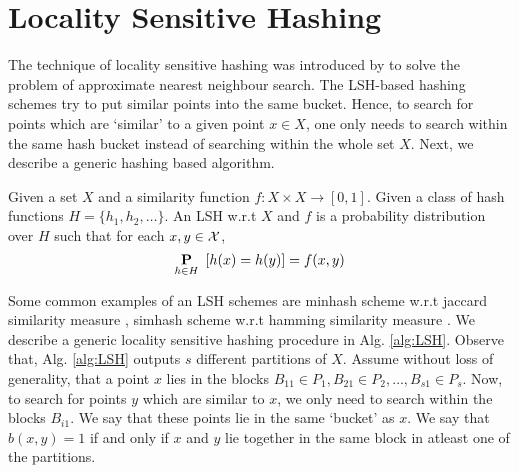 \section{Locality Sensitive Hashing}
\label{section:A-LSH}
The technique of locality sensitive hashing was introduced by \cite{gionis1999similarity} to solve the problem of approximate nearest neighbour search. The LSH-based hashing schemes try to put similar points into the same bucket. Hence, to search for points which are `similar' to a given point $x \in X$, one only needs to search within the same hash bucket instead of searching within the whole set $X$. Next, we describe a generic hashing based algorithm. 

\begin{definition}
\label{defn:LSH}
Given a set $X$ and a similarity function $f:X \times X \rightarrow [0, 1]$. Given a class of hash functions $H = \{h_1, h_2, \ldots \}$. An LSH w.r.t $X$ and $f$ is a probability distribution over $H$ such that for each $x, y \in \mathcal X$, $$\underset{h \in H}{\mathbf P}\enspace [h(x) = h(y)] = f(x, y)$$
\end{definition}
\noindent Some common examples of an LSH schemes are minhash scheme w.r.t jaccard similarity measure \cite{broder2000min, broder1997resemblance}, simhash scheme w.r.t hamming similarity measure \cite{charikar2002similarity}. We describe a generic locality sensitive hashing procedure in Alg. \ref{alg:LSH}. Observe that, Alg. \ref{alg:LSH} outputs $s$ different partitions of $X$. Assume without loss of generality, that a point $x$ lies in the blocks $B_{11} \in P_1, B_{21} \in P_2, \ldots, B_{s1} \in P_s$. Now, to search for points $y$ which are similar to $x$, we only need to search within the blocks $B_{i1}$. We say that these points lie in the same `bucket' as $x$. We say that $b(x, y) = 1$ if and only if $x$ and $y$ lie together in the same block in atleast one of the partitions.

